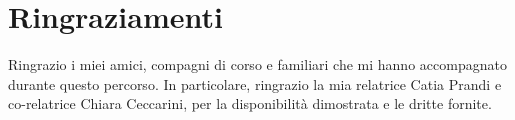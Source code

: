 \rhead[\fancyplain{}{\bfseries \leftmark}]{\fancyplain{}{\bfseries
\thepage}}

\clearpage{\pagestyle{empty}\cleardoublepage}
\chapter*{Ringraziamenti}
\thispagestyle{empty}
Ringrazio i miei amici, compagni di corso e familiari che mi hanno accompagnato durante questo percorso.
In particolare, ringrazio la mia relatrice Catia Prandi e co-relatrice Chiara Ceccarini, per la disponibilità dimostrata e le dritte fornite.